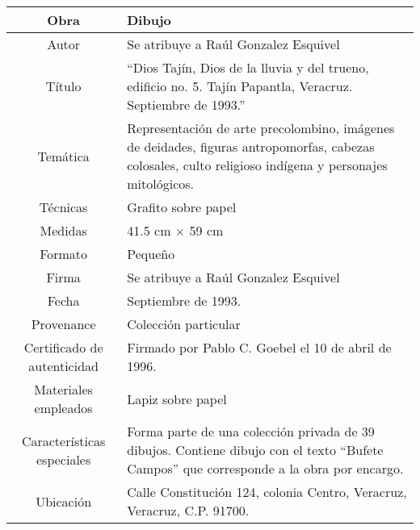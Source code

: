 \begin{table}[H]
\centering
\begin{tabular}{|c|m{}|}
\hline
Obra& Dibujo	\\
\hline
Autor & Se atribuye a Ra\'ul Gonzalez Esquivel\\
\hline
T\'itulo & ``Dios Taj\'in, Dios de la lluvia y del trueno, edificio no. 5. Taj\'in Papantla, Veracruz. Septiembre de 1993.''\\
\hline
Tem\'atica & Representaci\'on de arte precolombino, im\'agenes de deidades, figuras antropomorfas, cabezas colosales, culto religioso ind\'igena y personajes mitol\'ogicos.\\
\hline
T\'ecnicas &Grafito sobre papel \\
\hline
Medidas & 41.5 cm $\times$ 59 cm \\
\hline
 Formato & Peque\~no \\
 \hline
 Firma & Se atribuye a Ra\'ul Gonzalez Esquivel\\ 
 \hline
  Fecha & Septiembre de 1993.\\
 \hline
 Provenance & Colecci\'on particular\\
 \hline
 Certificado de autenticidad& Firmado por Pablo C. Goebel el 10 de abril de 1996.  \\
 \hline 
  Materiales empleados & Lapiz sobre papel\\
 \hline
 Caracter\'isticas especiales & Forma parte de una colecci\'on privada de 39 dibujos. 
Contiene dibujo con el texto ``Bufete Campos'' que corresponde a la obra por encargo. \\
\hline 
Ubicaci\'on & Calle Constituci\'on 124, colonia Centro, Veracruz, Veracruz, C.P. 91700.\\
\hline

\end{tabular}
\end{table}

